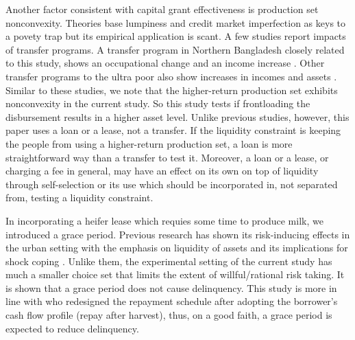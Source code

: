 	Another factor consistent with capital grant effectiveness is production set nonconvexity. Theories base lumpiness and credit market imperfection as keys to a povety trap \citep[e.g., ][]{GalorZeira1993} but its empirical application is scant. A few studies report impacts of transfer programs. A transfer program in Northern Bangladesh closely related to this study, shows an occupational change and an income increase \citep{BandieraBRAC2017}. Other transfer programs to the ultra poor also show increases in incomes and assets \citep{Blattman2014, BanerjeeetalScience2015, Blattmanetal2016, HaushoferShapiro2016}. %
Similar to these studies, we note that the higher-return production set exhibits nonconvexity in the current study. So this study tests if frontloading the disbursement results in a higher asset level. Unlike previous studies, however, this paper uses a loan or a lease, not a transfer. If the liquidity constraint is keeping the people from using a higher-return production set, a loan is more straightforward way than a transfer to test it. Moreover, a loan or a lease, or charging a fee in general, may have an effect on its own on top of liquidity through self-selection or its use \citep{Ashraf2010, CohenDupas2010} which should be incorporated in, not separated from, testing a liquidity constraint. 

	In incorporating a heifer lease which requies some time to produce milk, we introduced a grace period. Previous research has shown its risk-inducing effects in the urban setting with the emphasis on liquidity of assets and its implications for shock coping \citep{Field2013}. %
Unlike them, the experimental setting of the current study has much a smaller choice set that limits the extent of willful/rational risk taking. It is shown that a grace period does not cause delinquency. This study is more in line with \citet{Beaman2015} who redesigned the repayment schedule after adopting the borrower's cash flow profile (repay after harvest), thus, on a good faith, a grace period is expected to reduce delinquency. 



